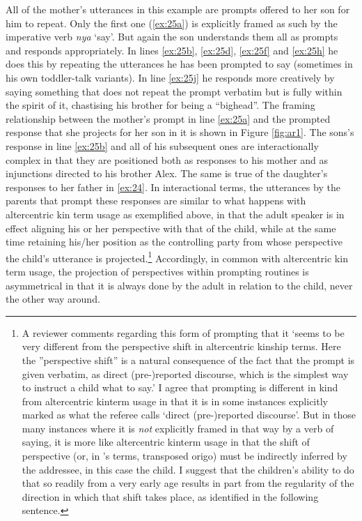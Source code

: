 \documentclass[output=paper]{langsci/langscibook}
\begin{document}
All of the mother’s utterances in this example are prompts offered to her son for him to repeat. Only the first one (\ref{ex:25a}) is explicitly framed as such by the imperative verb \textit{nya} ‘say’. But again the son understands them all as prompts and responds appropriately. In lines \ref{ex:25b}, \ref{ex:25d}, \ref{ex:25f} and \ref{ex:25h} he does this by repeating the utterances he has been prompted to say (sometimes in his own toddler-talk variants). In line \ref{ex:25j} he responds more creatively by saying something that does not repeat the prompt verbatim but is fully within the spirit of it, chastising his brother for being a “bighead”. The framing relationship between the mother’s prompt in line \ref{ex:25a} and the prompted response that she projects for her son in it is shown in Figure \ref{fig:ar1}. The sons’s response in line \ref{ex:25b} and all of his subsequent ones are interactionally complex in that they are positioned both as responses to his mother and as injunctions directed to his brother Alex. The same is true of the daughter’s responses to her father in \ref{ex:24}. In interactional terms, the utterances by the parents that prompt these responses are similar to what happens with altercentric kin term usage as exemplified above, in that the adult speaker is in effect aligning his or her perspective with that of the child, while at the same time retaining his/her position as the controlling party from whose perspective the child’s utterance is projected.\footnote{A reviewer comments regarding this form of prompting that it ‘seems to be very different from the perspective shift in altercentric kinship terms. Here the ”perspective shift” is a natural consequence of the fact that the prompt is given verbatim, as direct (pre-)reported discourse, which is the simplest way to instruct a child what to say.’ I agree that prompting is different in kind from altercentric kinterm usage in that it is in some instances explicitly marked as what the referee calls ‘direct (pre-)reported discourse’. But in those many instances where it is \emph{not} explicitly framed in that way by a verb of saying, it is more like altercentric kinterm usage in that the shift of perspective (or, in \citeauthor{Buhler1990}’s \citeyear{Buhler1990} terms, transposed origo) must be indirectly inferred by the addressee, in this case the child. I suggest that the children’s ability to do that so readily from a very early age results in part from the regularity of the direction in which that shift takes place, as identified in the following sentence.} Accordingly, in common with altercentric kin term usage, the projection of perspectives within prompting routines is asymmetrical in that it is always done by the adult in relation to the child, never the other way around.
\end{document}
